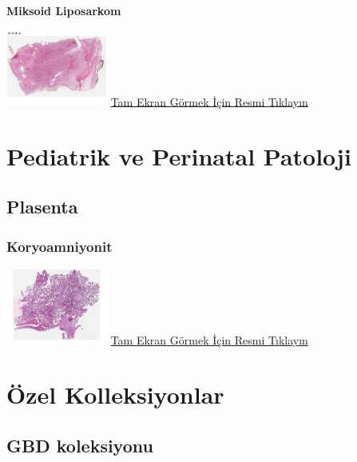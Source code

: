 \documentclass[
  letterpaper,
  DIV=11,
  numbers=noendperiod]{scrreprt}
\begin{document}
\textbf{Miksoid Liposarkom}

\href{https://images.patolojiatlasi.com/myxoidliposarcoma/HE.html}{\includegraphics[width=0.25\textwidth,height=\textheight]{./screenshots/myxoidliposarcoma_screenshot.png}}
\href{https://images.patolojiatlasi.com/myxoidliposarcoma/HE.html}{Tam
Ekran Görmek İçin Resmi Tıklayın}

\hypertarget{section}{%
\chapter{}\label{section}}

\part{Pediatrik ve Perinatal Patoloji}

\hypertarget{sec-plasenta}{%
\chapter{Plasenta}\label{sec-plasenta}}

\hypertarget{sec-koryoamniyonit}{%
\section{Koryoamniyonit}\label{sec-koryoamniyonit}}

\href{https://images.patolojiatlasi.com/chorioamnionitis/HE.html}{\includegraphics[width=0.25\textwidth,height=\textheight]{./screenshots/chorioamnionitis_screenshot.png}}
\href{https://images.patolojiatlasi.com/chorioamnionitis/HE.html}{Tam
Ekran Görmek İçin Resmi Tıklayın}

\part{Özel Kolleksiyonlar}

\hypertarget{gbd-koleksiyonu}{%
\chapter{GBD koleksiyonu}\label{gbd-koleksiyonu}}
\end{document}
